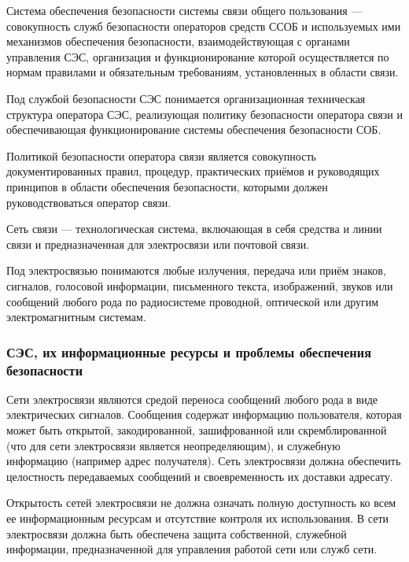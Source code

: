\documentclass[12pt, russian, oneside, article]{ncc}
\begin{document}
Система обеспечения безопасности системы связи общего пользования --- совокупность служб безопасности операторов средств ССОБ и используемых ими механизмов обеспечения безопасности, взаимодействующая с органами управления СЭС, организация и функционирование которой осуществляется по нормам правилами и обязательным требованиям, установленных в области связи.

Под службой безопасности СЭС понимается организационная техническая структура оператора СЭС, реализующая политику безопасности оператора связи и обеспечивающая функционирование системы обеспечения безопасности СОБ.

Политикой безопасности оператора связи является совокупность документированных правил, процедур, практических приёмов и руководящих принципов в области обеспечения безопасности, которыми должен руководствоваться оператор связи.

Сеть связи --- технологическая система, включающая в себя средства и линии связи и предназначенная для электросвязи или почтовой связи.

Под электросвязью понимаются любые излучения, передача или приём знаков, сигналов, голосовой информации, письменного текста, изображений, звуков или сообщений любого рода по радиосистеме проводной, оптической или другим электромагнитным системам.
\subsubsection{СЭС, их информационные ресурсы и проблемы обеспечения безопасности}
\label{sec-1_1_2}


Сети электросвязи являются средой переноса сообщений любого рода в виде электрических сигналов. Сообщения содержат информацию пользователя, которая может быть открытой, закодированной, зашифрованной или скремблированной (что для сети электросвязи является неопределяющим), и служебную информацию (например адрес получателя). Сеть электросвязи должна обеспечить целостность передаваемых сообщений и своевременность их доставки адресату.

Открытость сетей электросвязи не должна означать полную доступность ко всем ее информационным ресурсам и отсутствие контроля их использования. В сети электросвязи должна быть обеспечена защита собственной, служебной информации, предназначенной для управления работой сети или служб сети.
\end{document}
